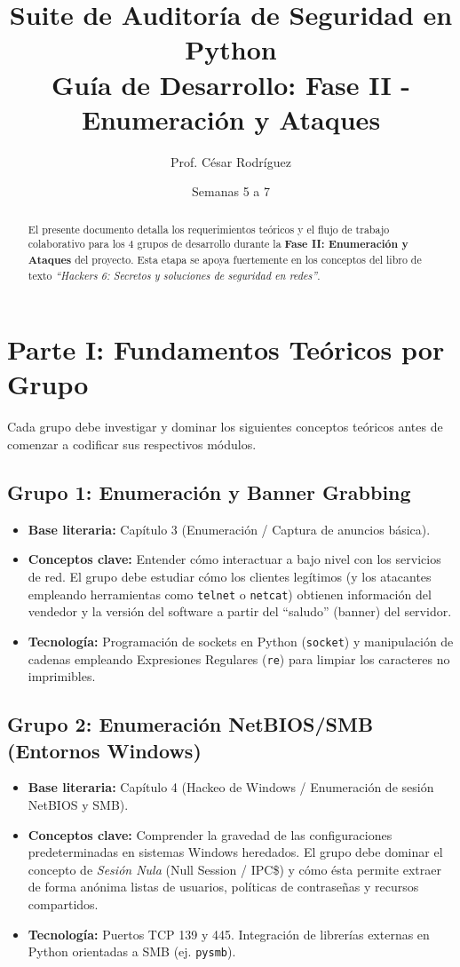 \documentclass[12pt,letterpaper]{article}
\title{\textbf{Suite de Auditoría de Seguridad en Python}\\ \Large Guía de Desarrollo: Fase II - Enumeración y Ataques}
\author{Prof. César Rodríguez}
\date{Semanas 5 a 7}
\begin{document}
\maketitle

\begin{abstract}
El presente documento detalla los requerimientos teóricos y el flujo de trabajo colaborativo para los 4 grupos de desarrollo durante la \textbf{Fase II: Enumeración y Ataques} del proyecto. Esta etapa se apoya fuertemente en los conceptos del libro de texto \textit{``Hackers 6: Secretos y soluciones de seguridad en redes''}.
\end{abstract}

\section{Parte I: Fundamentos Teóricos por Grupo}
Cada grupo debe investigar y dominar los siguientes conceptos teóricos antes de comenzar a codificar sus respectivos módulos.

\subsection*{Grupo 1: Enumeración y Banner Grabbing}
\begin{itemize}
    \item \textbf{Base literaria:} Capítulo 3 (Enumeración / Captura de anuncios básica).
    \item \textbf{Conceptos clave:} Entender cómo interactuar a bajo nivel con los servicios de red. El grupo debe estudiar cómo los clientes legítimos (y los atacantes empleando herramientas como \texttt{telnet} o \texttt{netcat}) obtienen información del vendedor y la versión del software a partir del ``saludo'' (banner) del servidor.
    \item \textbf{Tecnología:} Programación de sockets en Python (\texttt{socket}) y manipulación de cadenas empleando Expresiones Regulares (\texttt{re}) para limpiar los caracteres no imprimibles.
\end{itemize}

\subsection*{Grupo 2: Enumeración NetBIOS/SMB (Entornos Windows)}
\begin{itemize}
    \item \textbf{Base literaria:} Capítulo 4 (Hackeo de Windows / Enumeración de sesión NetBIOS y SMB).
    \item \textbf{Conceptos clave:} Comprender la gravedad de las configuraciones predeterminadas en sistemas Windows heredados. El grupo debe dominar el concepto de \textit{Sesión Nula} (Null Session / IPC\$) y cómo ésta permite extraer de forma anónima listas de usuarios, políticas de contraseñas y recursos compartidos.
    \item \textbf{Tecnología:} Puertos TCP 139 y 445. Integración de librerías externas en Python orientadas a SMB (ej. \texttt{pysmb}).
\end{itemize}
\end{document}
